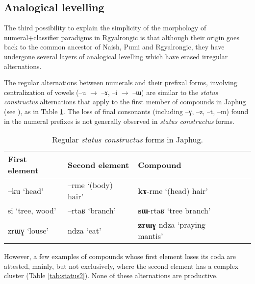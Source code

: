 \documentclass[oldfontcommands,oneside,a4paper,12pt]{article}
\newcommand{\ipa}[1]{{\phon#1}}
\begin{document}
\subsection{Analogical levelling}
The third possibility to explain the simplicity of the morphology of numeral+classifier paradigms in Rgyalrongic is that although their origin goes back to the common ancestor of Naish, Pumi and Rgyalrongic, they have undergone several layers of analogical levelling which have erased irregular alternations.

The  regular alternations between numerals and their prefixal forms, involving  centralization of vowels (\ipa{--u}  $\rightarrow$ \ipa{--ɤ}, \ipa{--i}  $\rightarrow$ \ipa{--ɯ}) are similar to the \textit{status constructus} alternations that apply to the first member of compounds in Japhug (see \citealt{jacques12incorp}), as in Table \ref{tab:status}. The loss of final consonants  (including \ipa{--ɣ}, \ipa{--z},  \ipa{--t},  \ipa{--m}) found in the numeral prefixes is not generally observed in \textit{status constructus} forms.

\begin{table}[H]
\caption{Regular \textit{status constructus} forms in Japhug.}  \label{tab:status} \centering
\begin{tabular}{lllll}
\toprule
First element & Second element & Compound \\
\midrule
 \ipa{--ku} `head' & \ipa{--rme} `(body) hair'  &\ipa{\textbf{kɤ}-rme} `(head) hair'   \\
  \ipa{si} `tree, wood' & \ipa{--rtaʁ} `branch'  &\ipa{\textbf{sɯ}-rtaʁ} `tree branch'   \\
  \midrule
  \ipa{zrɯɣ} `louse' & \ipa{ndza} `eat'  &\ipa{\textbf{zrɯɣ}-ndza} `praying mantis'   \\  
\bottomrule
\end{tabular}
\end{table}

  However, a few examples of compounds whose first element loses its coda are attested, mainly, but not exclusively, where the second element has a complex cluster (Table \ref{tab:status2}). None of these alternations are productive.
\end{document}
